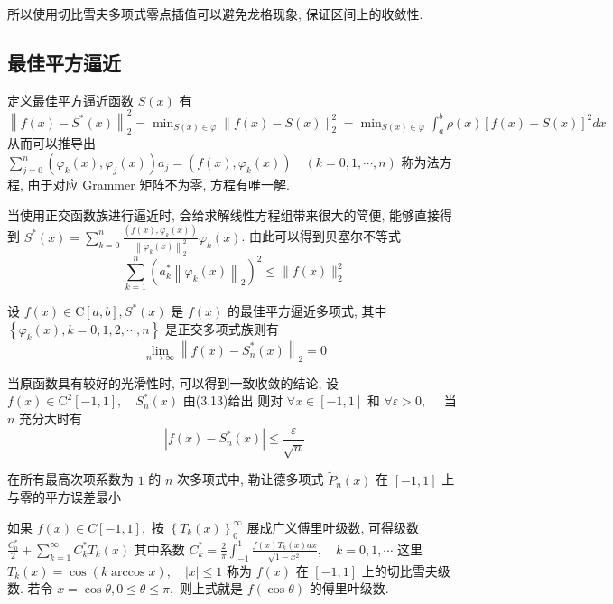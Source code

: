 \documentclass[10pt]{yerbaformat}
\begin{document}
\par 所以使用切比雪夫多项式零点插值可以避免龙格现象, 保证区间上的收敛性.

\subsection{最佳平方逼近}

\begin{definition}
    定义最佳平方逼近函数 $S(x)$ 有 $\left\|f(x)-S^{*}(x)\right\|_{2}^{2} =\min _{S(x) \in \varphi}\|f(x)-S(x)\|_{2}^{2} =\min _{S(x) \in \varphi} \int_{a}^{b} \rho(x)[f(x)-S(x)]^{2} d x $
    从而可以推导出 $\sum_{j=0}^{n}\left(\varphi_{k}(x), \varphi_{j}(x)\right) a_{j}=\left(f(x), \varphi_{k}(x)\right) \quad(k=0,1, \cdots, n)$ 称为法方程, 由于对应 Grammer 矩阵不为零, 方程有唯一解.
\end{definition}

\par 当使用正交函数族进行逼近时, 会给求解线性方程组带来很大的简便, 能够直接得到 $S^{*}(x)=\sum_{k=0}^{n} \frac{\left(f(x), \varphi_{k}(x)\right)}{\left\|\varphi_{k}(x)\right\|_{2}^{2}} \varphi_{k}(x)$. 由此可以得到贝塞尔不等式 $$ \sum_{k=1}^{n}\left(a_{k}^{*}\left\|\varphi_{k}(x)\right\|_{2}\right)^{2} \leq\|f(x)\|_{2}^{2} $$

\begin{theorem}
    设 $f(x) \in \mathrm{C}[a, b], S^{*}(x)$ 是 $f(x)$
    的最佳平方逼近多项式, 其中 $\left\{\varphi_{k}(x), k=0,1,2, \cdots, n\right\}$
    是正交多项式族则有
    $$
        \lim _{n \rightarrow \infty}\left\|f(x)-S_{n}^{*}(x)\right\|_{2}=0
    $$
\end{theorem}

\begin{theorem}
    当原函数具有较好的光滑性时, 可以得到一致收敛的结论, 设 $f(x) \in \mathrm{C}^{2}[-1,1], \quad S_{n}^{*}(x)$ 由(3.13)给出
    则对 $\forall x \in[-1,1]$ 和 $\forall \varepsilon>0, \quad$ 当 $n$ 充分大时有
    $$
        \left|f(x)-S_{n}^{*}(x)\right| \leq \frac{\varepsilon}{\sqrt{n}}
    $$
\end{theorem}

\begin{theorem}
    在所有最高次项系数为 $1$ 的 $n$ 次多项式中, 勒让德多项式 $\widetilde{P}_{n}(x)$ 在 $[-1, 1]$ 上与零的平方误差最小
\end{theorem}

\begin{definition}
    如果 $f(x) \in C[-1,1],$ 按 $\left\{T_{k}(x)\right\}_{0}^{\infty}$ 展成广义傅里叶级数,
    可得级数 $\frac{C_{0}^{*}}{2}+\sum_{k=1}^{\infty} C_{k}^{*} T_{k}(x)$
    其中系数 $C_{k}^{*}=\frac{2}{\pi} \int_{-1}^{1} \frac{f(x) T_{k}(x) d x}{\sqrt{1-x^{2}}}, \quad k=0,1, \cdots$ 这里 $ T_{k}(x)=\cos (k \arccos x), \quad|x| \leq 1$ 称为 $f(x)$ 在 $[-1,1]$ 上的切比雪夫级数.
    若令 $x=\cos \theta, 0 \leq \theta \leq \pi,$ 则上式就是 $f(\cos \theta)$ 的傅里叶级数.
\end{definition}
\end{document}
